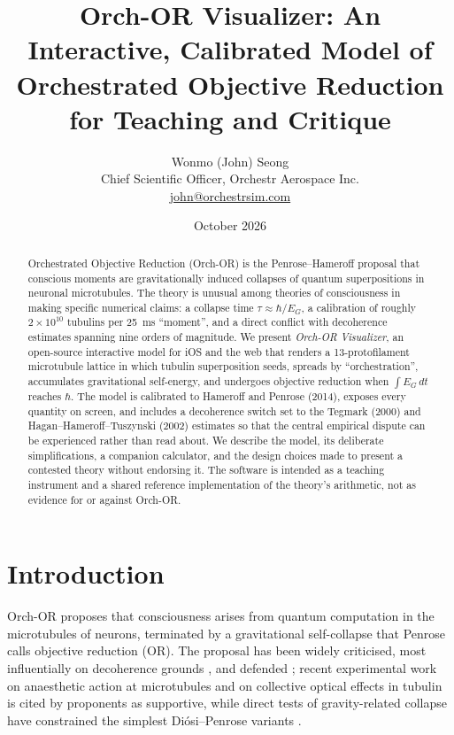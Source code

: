 \documentclass[11pt]{article}
\title{Orch-OR Visualizer: An Interactive, Calibrated Model of\\Orchestrated Objective Reduction for Teaching and Critique}
\author{Wonmo (John) Seong\\ \small Chief Scientific Officer, Orchestr Aerospace Inc.\\ \small \href{mailto:john@orchestrsim.com}{john@orchestrsim.com}}
\date{October 2026}
\begin{document}
\maketitle

\begin{abstract}
Orchestrated Objective Reduction (Orch-OR) is the Penrose--Hameroff proposal that conscious moments are gravitationally induced collapses of quantum superpositions in neuronal microtubules. The theory is unusual among theories of consciousness in making specific numerical claims: a collapse time $\tau \approx \hbar/E_G$, a calibration of roughly $2\times10^{10}$ tubulins per 25~ms ``moment'', and a direct conflict with decoherence estimates spanning nine orders of magnitude. We present \emph{Orch-OR Visualizer}, an open-source interactive model for iOS and the web that renders a 13-protofilament microtubule lattice in which tubulin superposition seeds, spreads by ``orchestration'', accumulates gravitational self-energy, and undergoes objective reduction when $\int E_G\,dt$ reaches $\hbar$. The model is calibrated to Hameroff and Penrose (2014), exposes every quantity on screen, and includes a decoherence switch set to the Tegmark (2000) and Hagan--Hameroff--Tuszynski (2002) estimates so that the central empirical dispute can be experienced rather than read about. We describe the model, its deliberate simplifications, a companion calculator, and the design choices made to present a contested theory without endorsing it. The software is intended as a teaching instrument and a shared reference implementation of the theory's arithmetic, not as evidence for or against Orch-OR.
\end{abstract}

\section{Introduction}
Orch-OR \citep{penrose1989,penrose1994,hameroff1996,hameroff2014} proposes that consciousness arises from quantum computation in the microtubules of neurons, terminated by a gravitational self-collapse that Penrose calls objective reduction (OR). The proposal has been widely criticised, most influentially on decoherence grounds \citep{tegmark2000,koch2006}, and defended \citep{hagan2002}; recent experimental work on anaesthetic action at microtubules \citep{khan2024} and on collective optical effects in tubulin \citep{babcock2024,kalra2023} is cited by proponents as supportive, while direct tests of gravity-related collapse have constrained the simplest Di\'osi--Penrose variants \citep{donadi2021}.
\end{document}

